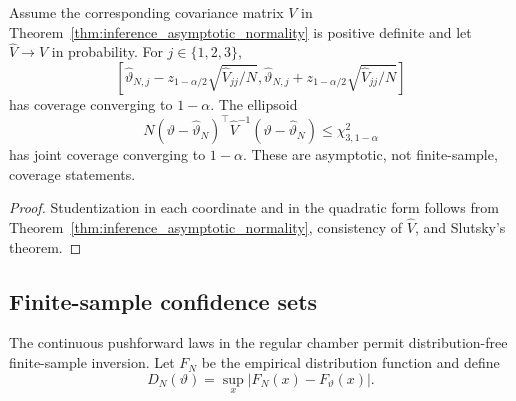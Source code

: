 \documentclass[11pt]{amsart}
\numberwithin{equation}{section}\setcounter{tocdepth}{3}\setcounter{secnumdepth}{3}
\begin{document}
\begin{corollary}\label{cor:asymptotic_confidence_intervals}
Assume the corresponding covariance matrix $V$ in
Theorem~\ref{thm:inference_asymptotic_normality} is positive definite and let
$\widehat V\to V$ in probability.  For $j\in\{1,2,3\}$,
\begin{equation}
 \left[
 \widehat\vartheta_{N,j}-z_{1-\alpha/2}
      \sqrt{\widehat V_{jj}/N},
 \widehat\vartheta_{N,j}+z_{1-\alpha/2}
      \sqrt{\widehat V_{jj}/N}
 \right]
 \label{eq:wald_interval}
\end{equation}
has coverage converging to $1-\alpha$.  The ellipsoid
\begin{equation}
 N(\vartheta-\widehat\vartheta_N)^\top\widehat V^{-1}
 (\vartheta-\widehat\vartheta_N)
 \le\chi^2_{3,1-\alpha}
 \label{eq:wald_ellipsoid}
\end{equation}
has joint coverage converging to $1-\alpha$.
These are asymptotic, not finite-sample, coverage statements.
\end{corollary}
\begin{proof}
Studentization in each coordinate and in the quadratic form follows from
Theorem~\ref{thm:inference_asymptotic_normality}, consistency of $\widehat V$, and
Slutsky's theorem.
\end{proof}

\subsection{Finite-sample confidence sets}\label{subsec:finite_sample_confidence}
The continuous pushforward laws in the regular chamber permit distribution-free
finite-sample inversion.  Let $F_N$ be the empirical distribution function and define
\begin{equation}
 D_N(\vartheta)=\sup_x|F_N(x)-F_\vartheta(x)|.
 \label{eq:ks_distance_parameter}
\end{equation}
\end{document}

